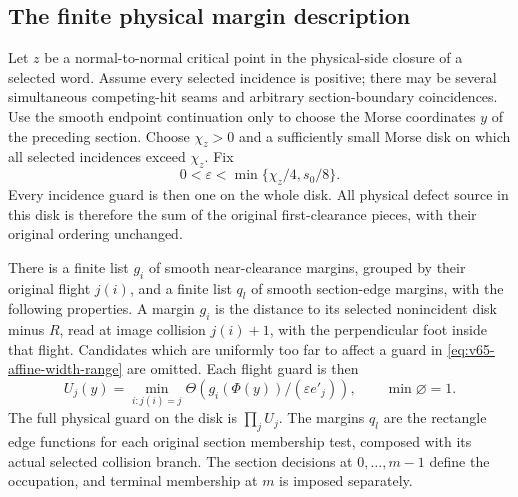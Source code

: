 \subsection{The finite physical margin description}
Let $z$ be a normal-to-normal critical point in the physical-side
closure of a selected word. Assume every selected incidence is positive;
there may be several simultaneous competing-hit seams and arbitrary
section-boundary coincidences. Use the smooth endpoint continuation
only to choose the Morse coordinates $y$ of the preceding section.
Choose $\chi_z>0$ and a sufficiently small Morse disk on which all
selected incidences exceed $\chi_z$. Fix
\begin{equation}\label{eq:v65-affine-width-range}
 0<\varepsilon<\min\{\chi_z/4,s_0/8\}.
\end{equation}
Every incidence guard is then one on the whole disk. All physical
defect source in this disk is therefore the sum of the original
first-clearance pieces, with their original ordering unchanged.

There is a finite list $g_i$ of smooth near-clearance margins, grouped
by their original flight $j(i)$, and a finite list $q_l$ of smooth
section-edge margins, with the following properties. A margin $g_i$
is the distance to its selected nonincident disk minus $R$, read at
image collision $j(i)+1$, with the perpendicular foot inside that
flight. Candidates which are uniformly too far to affect a guard in
\eqref{eq:v65-affine-width-range} are omitted. Each flight guard is
then
\begin{equation}\label{eq:v65-guard-minimum}
 U_j(y)=\min_{i:j(i)=j}
           \Theta(g_i(\Phi(y))/(\varepsilon e'_j)),
               \qquad \min\varnothing=1.
\end{equation}
The full physical guard on the disk is $\prod_jU_j$. The margins
$q_l$ are the rectangle edge functions for each original section
membership test, composed with its actual selected collision branch.
The section decisions at $0,\ldots,m-1$ define the occupation, and
terminal membership at $m$ is imposed separately.

